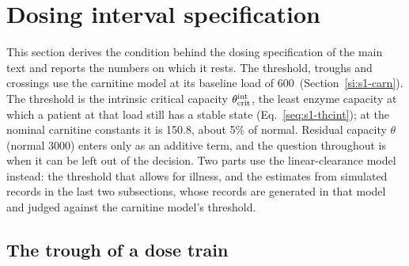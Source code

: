 \section{Dosing interval specification}
\label{si:s6}

This section derives the condition behind the dosing specification of the main text and
reports the numbers on which it rests. The threshold, troughs and crossings use the carnitine
model at its baseline load of 600\um\ (Section~\ref{si:s1-carn}). The threshold is the intrinsic
critical capacity $\theta_{\mathrm{crit}}^{\mathrm{int}}$, the least enzyme capacity at which a patient at that load still has a
stable state (Eq.~\eqref{seq:s1-thcint}); at the nominal carnitine constants it is 150.8\um,
about 5\% of normal. Residual capacity $\theta$ (normal 3000\um) enters only as an additive term,
and the question throughout is when it can be left out of the decision. Two parts use the
linear-clearance model instead: the threshold that allows for illness, and the estimates from
simulated records in the last two subsections, whose records are generated in that model and
judged against the carnitine model's threshold.

\subsection{The trough of a dose train}
\label{si:s6:trough}

